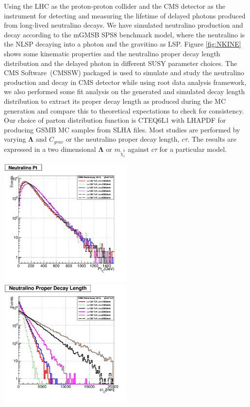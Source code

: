 {%
Using the LHC as the proton-proton collider and the CMS detector as the instrument for detecting and measuring the lifetime of delayed photons produced from long-lived neutralino decays. We have simulated neutralino production and decay according to the mGMSB SPS8 benchmark model, where the neutralino is the NLSP decaying into a photon and the gravitino as LSP. Figure \ref{fig:NKINE} shows some kinematic properties and the neutralino proper decay length distribution and the delayed photon in different  SUSY parameter choices. The CMS Software~(CMSSW) packaged is used to simulate and study the neutralino production and decay in CMS detector while using root data analysis framework, we also performed some fit analysis on the generated and simulated decay length distribution to extract its proper decay length as produced during the MC generation and compare this to theoretical expectations to check for consistency. Our choice of parton distribution function is CTEQ6L1 with LHAPDF for producing GSMB MC samples from SLHA files. Most studies are performed by varying $\mathbf{\Lambda}$ and $C_{grav}$ or the neutralino proper decay length, $c\tau$. The results are expressed in a two dimensional $\mathbf{\Lambda}$ or $m_{\tilde{\chi}^{0}_{1}}$ against $c\tau$ for a particular model.
\begin{center}
\centering
\mbox{\includegraphics[height=0.5\textwidth,width=0.5\textwidth]{THESISPLOTS/GMSB-SPS8-MODEL-Neutralinio-Pt.png} \hspace{-1cm}
\includegraphics[height=0.5\textwidth,width=0.5\textwidth]{THESISPLOTS/GMSB-SPS8-MODEL-Neutralino-Proper-DecayLength.png}} \\

\end{center}}
